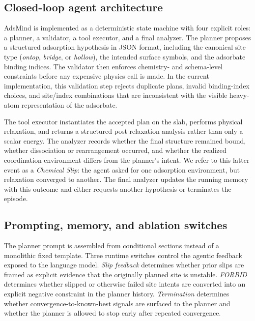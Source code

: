 
\subsection{Closed-loop agent architecture}

AdsMind is implemented as a deterministic state machine with four explicit roles: a planner, a validator, a tool executor, and a final analyzer. The planner proposes a structured adsorption hypothesis in JSON format, including the canonical site type (\textit{ontop}, \textit{bridge}, or \textit{hollow}), the intended surface symbols, and the adsorbate binding indices. The validator then enforces chemistry- and schema-level constraints before any expensive physics call is made. In the current implementation, this validation step rejects duplicate plans, invalid binding-index choices, and site/index combinations that are inconsistent with the visible heavy-atom representation of the adsorbate.

The tool executor instantiates the accepted plan on the slab, performs physical relaxation, and returns a structured post-relaxation analysis rather than only a scalar energy. The analyzer records whether the final structure remained bound, whether dissociation or rearrangement occurred, and whether the realized coordination environment differs from the planner's intent. We refer to this latter event as a \textit{Chemical Slip}: the agent asked for one adsorption environment, but relaxation converged to another. The final analyzer updates the running memory with this outcome and either requests another hypothesis or terminates the episode.

\subsection{Prompting, memory, and ablation switches}

The planner prompt is assembled from conditional sections instead of a monolithic fixed template. Three runtime switches control the agentic feedback exposed to the language model. \textit{Slip feedback} determines whether prior slips are framed as explicit evidence that the originally planned site is unstable. \textit{FORBID} determines whether slipped or otherwise failed site intents are converted into an explicit negative constraint in the planner history. \textit{Termination} determines whether convergence-to-known-best signals are surfaced to the planner and whether the planner is allowed to stop early after repeated convergence.

